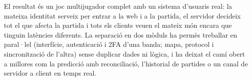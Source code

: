 \documentclass[11pt,a4paper]{article}
\begin{document}
El resultat és un joc multijugador complet amb un sistema d'usuaris real: la mateixa
identitat serveix per entrar a la web i a la partida, el servidor decideix tot el que
afecta la partida i tots els clients veuen el mateix món encara que tinguin latències
diferents. La separació en dos mòduls ha permès treballar en paral·lel (interfície,
autenticació i 2FA d'una banda; mapa, protocol i sincronització de l'altra) sense
duplicar dades ni lògica, i ha deixat el camí obert a millores com la predicció amb
reconciliació, l'historial de partides o un canal de servidor a client en temps real.
\end{document}
